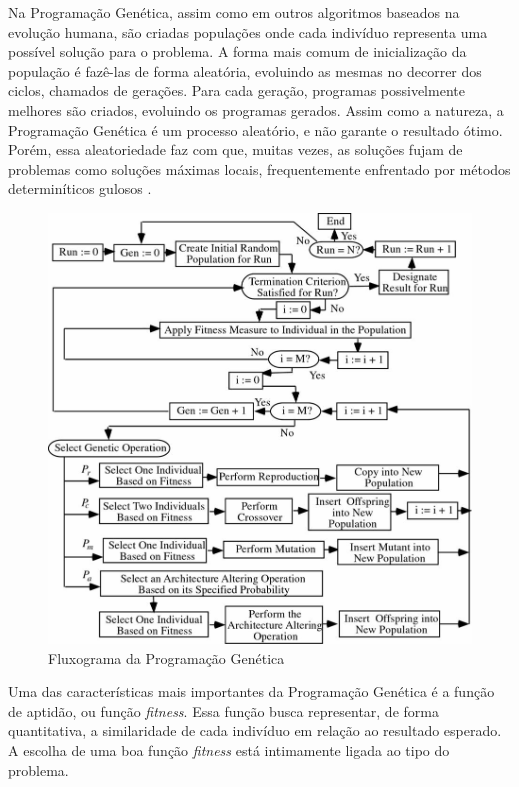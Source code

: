 \documentclass[12pt]{article}
\begin{document}
Na Programação Genética, assim como em outros algoritmos baseados na evolução humana, são criadas populações onde cada indivíduo representa uma possível solução para o problema. A forma mais comum de inicialização da população é fazê-las de forma aleatória, evoluindo as mesmas no decorrer dos ciclos, chamados de gerações. Para cada geração, programas possivelmente melhores são criados, evoluindo os programas gerados. Assim como a natureza, a Programação Genética é um processo aleatório, e não garante o resultado ótimo. Porém, essa aleatoriedade faz com que, muitas vezes, as soluções fujam de problemas como soluções máximas locais, frequentemente enfrentado por métodos determiníticos gulosos \cite{mcphee2008field}.

\begin{figure}[!htb]
	\centering
	\includegraphics{GPFlowChart}
	\caption{Fluxograma da Programação Genética}
	\label{flowchart GP}
\end{figure}

Uma das características mais importantes da Programação Genética é a função de aptidão, ou função \emph{fitness}. Essa função busca representar, de forma quantitativa, a similaridade de cada indivíduo em relação ao resultado esperado. A escolha de uma boa função \emph{fitness} está intimamente ligada ao tipo do problema.
\end{document}
